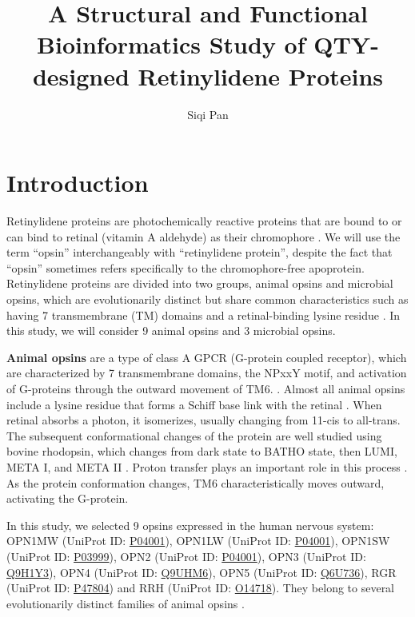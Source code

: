 \documentclass[fleqn, 10pt]{manuscript}
\title{A Structural and Functional Bioinformatics Study of QTY-designed Retinylidene Proteins}
\author[1]{Siqi Pan}
\affil[1]{Shanghai World Foreign Language Academy, 400 Baihua Street, Shanghai 200233, China}
\begin{document}
\flushbottom
\maketitle
\thispagestyle{empty}

\section*{Introduction}

Retinylidene proteins are photochemically reactive proteins that are bound to or can bind to retinal (vitamin A aldehyde) as their chromophore \citep{Spudich_2000}. We will use the term ``opsin'' interchangeably with ``retinylidene protein'', despite the fact that ``opsin'' sometimes refers specifically to the chromophore-free apoprotein. Retinylidene proteins are divided into two groups, animal opsins and microbial opsins, which are evolutionarily distinct but share common characteristics such as having 7 transmembrane (TM) domains and a retinal-binding lysine residue \citep{Yee_2013, Spudich_2000}. In this study, we will consider 9 animal opsins and 3 microbial opsins. 

\textbf{Animal opsins} are a type of class A GPCR (G-protein coupled receptor), which are characterized by 7 transmembrane domains, the NPxxY motif, and activation of G-proteins through the outward movement of TM6. \citep{Zhou_2019}. Almost all animal opsins include a lysine residue that forms a Schiff base link with the retinal \citep{Guhmann_2022}. When retinal absorbs a photon, it isomerizes, usually changing from 11-cis to all-trans. The subsequent conformational changes of the protein are well studied using bovine rhodopsin, which changes from dark state to BATHO state, then LUMI, META I, and META II \citep{Okada_2001}. Proton transfer plays an important role in this process \citep{Mahalingam_2008}. As the protein conformation changes, TM6 characteristically moves outward, activating the G-protein. 

In this study, we selected 9 opsins expressed in the human nervous system: OPN1MW (UniProt ID: \href{https://www.uniprot.org/uniprotkb/P04001/entry}{P04001}), OPN1LW (UniProt ID: \href{https://www.uniprot.org/uniprotkb/P04000/entry}{P04001}), OPN1SW (UniProt ID: \href{https://www.uniprot.org/uniprotkb/P03999/entry}{P03999}), OPN2 (UniProt ID: \href{https://www.uniprot.org/uniprotkb/P08100/entry}{P04001}), OPN3 (UniProt ID: \href{https://www.uniprot.org/uniprotkb/Q9H1Y3/entry}{Q9H1Y3}), OPN4 (UniProt ID: \href{https://www.uniprot.org/uniprotkb/Q9UHM6/entry}{Q9UHM6}), OPN5 (UniProt ID: \href{https://www.uniprot.org/uniprotkb/Q6U736/entry}{Q6U736}), RGR (UniProt ID: \href{https://www.uniprot.org/uniprotkb/P47804/entry}{P47804}) and RRH (UniProt ID: \href{https://www.uniprot.org/uniprotkb/O14718/entry}{O14718}). They belong to several evolutionarily distinct families of animal opsins \citep{Terakita_2005}. 
\end{document}
